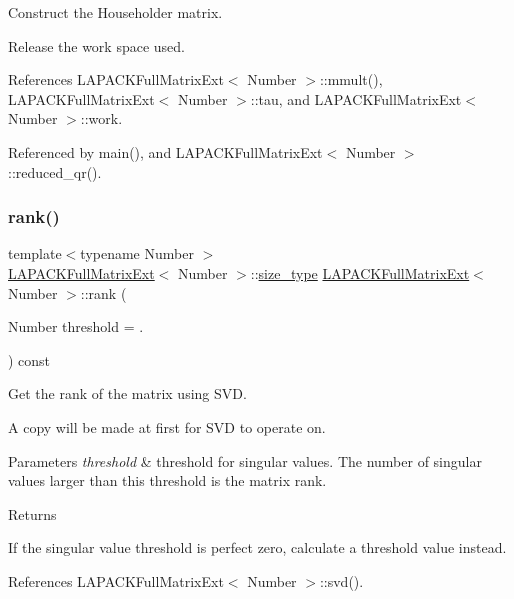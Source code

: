 Construct the Householder matrix.

Release the work space used.

References L\+A\+P\+A\+C\+K\+Full\+Matrix\+Ext$<$ Number $>$\+::mmult(), L\+A\+P\+A\+C\+K\+Full\+Matrix\+Ext$<$ Number $>$\+::tau, and L\+A\+P\+A\+C\+K\+Full\+Matrix\+Ext$<$ Number $>$\+::work.



Referenced by main(), and L\+A\+P\+A\+C\+K\+Full\+Matrix\+Ext$<$ Number $>$\+::reduced\+\_\+qr().

\mbox{\label{classLAPACKFullMatrixExt_a94f6a6df2b48201549f58bcbadcc6053}} 
\subsubsection{\texorpdfstring{rank()}{rank()}}
{\footnotesize\ttfamily template$<$typename Number $>$ \\
\hyperlink{classLAPACKFullMatrixExt}{L\+A\+P\+A\+C\+K\+Full\+Matrix\+Ext}$<$ Number $>$\+::\hyperlink{classLAPACKFullMatrixExt_a5cf5f4a6104dc17029210b5ca52bf574}{size\+\_\+type} \hyperlink{classLAPACKFullMatrixExt}{L\+A\+P\+A\+C\+K\+Full\+Matrix\+Ext}$<$ Number $>$\+::rank (\begin{DoxyParamCaption}\item[{Number}]{threshold = {.} }\end{DoxyParamCaption}) const}

Get the rank of the matrix using S\+VD.

A copy will be made at first for S\+VD to operate on. 
\begin{DoxyParams}{Parameters}
{\em threshold} & threshold for singular values. The number of singular values larger than this threshold is the matrix rank. \\
\hline
\end{DoxyParams}
\begin{DoxyReturn}{Returns}

\end{DoxyReturn}
If the singular value threshold is perfect zero, calculate a threshold value instead.

References L\+A\+P\+A\+C\+K\+Full\+Matrix\+Ext$<$ Number $>$\+::svd().



